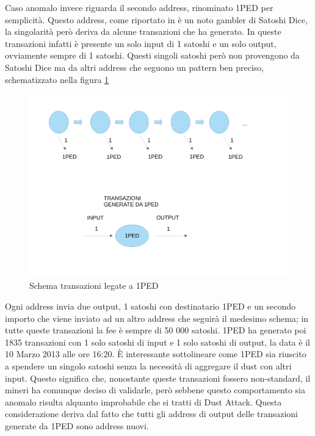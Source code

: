 Caso anomalo invece riguarda il secondo address, rinominato 1PED per semplicità. Questo address, come riportato in \cite{dustAnalisi} è un noto gambler di Satoshi Dice, la singolarità però deriva da alcune transazioni che ha generato. In queste transazioni infatti è presente un solo input di 1 satoshi e un solo output, ovviamente sempre di 1 satoshi. Questi singoli satoshi però non provengono da Satoshi Dice ma da altri address che seguono un pattern ben preciso, schematizzato nella figura \ref{fig:1PED}
\begin{figure}[h!]
    \centering
    \includegraphics[scale=0.4]{Images/1Ped.pdf}
    \caption{Schema transazioni legate a 1PED}
    \label{fig:1PED}
\end{figure}
\FloatBarrier
Ogni address invia due output, 1 satoshi con destinatario 1PED e un secondo importo che viene inviato ad un altro address che seguirà il medesimo schema; in tutte queste transazioni la fee è sempre di 50 000 satoshi. 1PED ha generato poi 1835 transazioni con 1 solo satoshi di input e 1 solo satoshi di output, la data è il 10 Marzo 2013 alle ore 16:20. È interessante sottolineare come 1PED sia riuscito a spendere un singolo satoshi senza la necessità di aggregare il dust con altri input. Questo significa che, nonostante queste transazioni fossero non-standard, il mineri ha comunque deciso di validarle, però sebbene questo comportamento sia anomalo risulta alquanto improbabile che si tratti di Dust Attack. Questa considerazione deriva dal fatto che tutti gli address di output delle transazioni generate da 1PED sono address nuovi.

